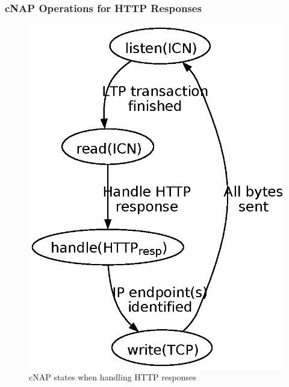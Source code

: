 \documentclass[a4paper,11pt,titlepage]{report}
\begin{document}
\subsubsection{\acl{cNAP} Operations for HTTP Responses}
\begin{figure}[!htb]
	\centering
	\includegraphics[width=1\linewidth]{eps/proxyStateMachine-HTTPresponses-cNAP}
	\caption{cNAP states when handling HTTP responses}
	\label{fig:Handling_HTTP_responses_cNAP}
\end{figure}
\end{document}

